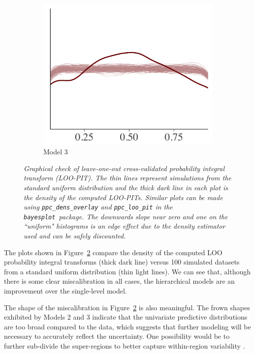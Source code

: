 \documentclass{statsoc}
\newcommand{\bayesplot}{{\tt bayesplot}}
\begin{document}
\begin{figure}
\begin{subfigure}{0.31\textwidth}
\includegraphics[width=\textwidth]{ppc_loo_pit_overlay3.png}
\caption{Model 3}
\label{fig:ppc_loo_pit_unif3}
\end{subfigure}

\caption{\it Graphical check of leave-one-out cross-validated probability
integral transform (LOO-PIT). The thin lines represent simulations from the
standard uniform distribution and the thick dark line in each plot is the
density of the computed LOO-PITs. Similar plots can be made using
{\tt ppc\_dens\_overlay} and {\tt ppc\_loo\_pit}  in the \bayesplot\ package. 
The downwards slope near zero and one on the ``uniform" histograms is an 
edge effect due to the density estimator used and can be safely discounted.}
\label{fig:ppc_loo_pit_unif}
\end{figure}

The plots shown in Figure~\ref{fig:ppc_loo_pit_unif} compare the density of the
computed LOO probability integral transforms (thick dark line) versus 100 simulated 
datasets from a standard uniform distribution (thin light lines).  We can see that, 
although there is some clear miscalibration in all cases, the hierarchical models are 
an improvement over the single-level model.

The shape of the miscalibration in Figure~\ref{fig:ppc_loo_pit_unif} is also
meaningful. The frown shapes exhibited by Models 2 and 3 indicate that the
univariate predictive distributions are too broad compared to the data, which
suggests that further modeling will be necessary to accurately reflect the
uncertainty. One possibility would be to further sub-divide the super-regions to
better capture within-region variability \citep{shaddick2017data}.
\end{document}
